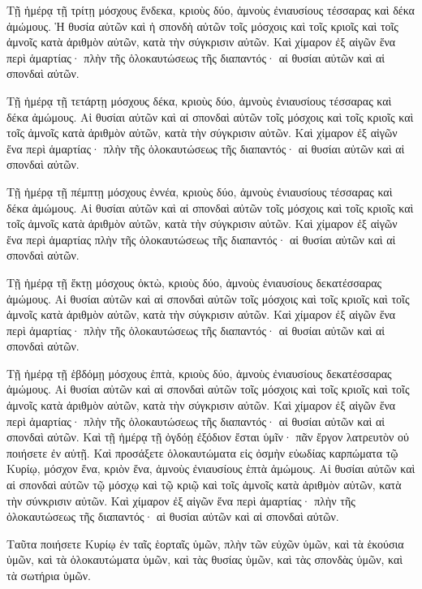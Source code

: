 {\par }{\PP {}Τῇ ἡμέρᾳ τῇ τρίτῃ μόσχους ἕνδεκα, κριοὺς δύο, ἀμνοὺς ἐνιαυσίους τέσσαρας καὶ δέκα ἀμώμους.
Ἡ θυσία αὐτῶν καὶ ἡ σπονδὴ αὐτῶν τοῖς μόσχοις καὶ τοῖς κριοῖς καὶ τοῖς ἀμνοῖς κατὰ ἀριθμὸν αὐτῶν, κατὰ τὴν σύγκρισιν αὐτῶν.
Καὶ χίμαρον ἐξ αἰγῶν ἕνα περὶ ἁμαρτίας· πλὴν τῆς ὁλοκαυτώσεως τῆς διαπαντός· αἱ θυσίαι αὐτῶν καὶ αἱ σπονδαὶ αὐτῶν.
\par }{\PP {}Τῇ ἡμέρᾳ τῇ τετάρτῃ μόσχους δέκα, κριοὺς δύο, ἀμνοὺς ἐνιαυσίους τέσσαρας καὶ δέκα ἀμώμους.
Αἱ θυσίαι αὐτῶν καὶ αἱ σπονδαὶ αὐτῶν τοῖς μόσχοις καὶ τοῖς κριοῖς καὶ τοῖς ἀμνοῖς κατὰ ἀριθμὸν αὐτῶν, κατὰ τὴν σύγκρισιν αὐτῶν.
Καὶ χίμαρον ἐξ αἰγῶν ἕνα περὶ ἁμαρτίας· πλὴν τῆς ὁλοκαυτώσεως τῆς διαπαντός· αἱ θυσίαι αὐτῶν καὶ αἱ σπονδαὶ αὐτῶν.
\par }{\PP {}Τῇ ἡμέρᾳ τῇ πέμπτῃ μόσχους ἐννέα, κριοὺς δύο, ἀμνοὺς ἐνιαυσίους τέσσαρας καὶ δέκα ἀμώμους.
Αἱ θυσίαι αὐτῶν καὶ αἱ σπονδαὶ αὐτῶν τοῖς μόσχοις καὶ τοῖς κριοῖς καὶ τοῖς ἀμνοῖς κατὰ ἀριθμὸν αὐτῶν, κατὰ τὴν σύγκρισιν αὐτῶν.
Καὶ χίμαρον ἐξ αἰγῶν ἕνα περὶ ἁμαρτίας πλὴν τῆς ὁλοκαυτώσεως τῆς διαπαντός· αἱ θυσίαι αὐτῶν καὶ αἱ σπονδαὶ αὐτῶν.
\par }{\PP {}Τῇ ἡμέρᾳ τῇ ἕκτῃ μόσχους ὀκτὼ, κριοὺς δύο, ἀμνοὺς ἐνιαυσίους δεκατέσσαρας ἀμώμους.
Αἱ θυσίαι αὐτῶν καὶ αἱ σπονδαὶ αὐτῶν τοῖς μόσχοις καὶ τοῖς κριοῖς καὶ τοῖς ἀμνοῖς κατὰ ἀριθμὸν αὐτῶν, κατὰ τὴν σύγκρισιν αὐτῶν.
Καὶ χίμαρον ἐξ αἰγῶν ἕνα περὶ ἁμαρτίας· πλὴν τῆς ὁλοκαυτώσεως τῆς διαπαντός· αἱ θυσίαι αὐτῶν καὶ αἱ σπονδαὶ αὐτῶν.
\par }{\PP {}Τῇ ἡμέρᾳ τῇ ἑβδόμῃ μόσχους ἑπτὰ, κριοὺς δύο, ἀμνοὺς ἐνιαυσίους δεκατέσσαρας ἀμώμους.
Αἱ θυσίαι αὐτῶν καὶ αἱ σπονδαὶ αὐτῶν τοῖς μόσχοις καὶ τοῖς κριοῖς καὶ τοῖς ἀμνοῖς κατὰ ἀριθμὸν αὐτῶν, κατὰ τὴν σύγκρισιν αὐτῶν.
Καὶ χίμαρον ἐξ αἰγῶν ἕνα περὶ ἁμαρτίας· πλὴν τῆς ὁλοκαυτώσεως τῆς διαπαντός· αἱ θυσίαι αὐτῶν καὶ αἱ σπονδαὶ αὐτῶν.
Καὶ τῇ ἡμέρᾳ τῇ ὀγδόῃ ἐξόδιον ἔσται ὑμῖν· πᾶν ἔργον λατρευτὸν οὐ ποιήσετε ἐν αὐτῇ.
Καὶ προσάξετε ὁλοκαυτώματα εἰς ὀσμὴν εὐωδίας καρπώματα τῷ Κυρίῳ, μόσχον ἕνα, κριὸν ἕνα, ἀμνοὺς ἐνιαυσίους ἑπτὰ ἀμώμους.
Αἱ θυσίαι αὐτῶν καὶ αἱ σπονδαὶ αὐτῶν τῷ μόσχῳ καὶ τῷ κριῷ καὶ τοῖς ἀμνοῖς κατὰ ἀριθμὸν αὐτῶν, κατὰ τὴν σύνκρισιν αὐτῶν.
Καὶ χίμαρον ἐξ αἰγῶν ἕνα περὶ ἁμαρτίας· πλὴν τῆς ὁλοκαυτώσεως τῆς διαπαντός· αἱ θυσίαι αὐτῶν καὶ αἱ σπονδαὶ αὐτῶν.
\par }{\PP {}Ταῦτα ποιήσετε Κυρίῳ ἐν ταῖς ἑορταῖς ὑμῶν, πλὴν τῶν εὐχῶν ὑμῶν, καὶ τὰ ἑκούσια ὑμῶν, καὶ τὰ ὁλοκαυτώματα ὑμῶν, καὶ τὰς θυσίας ὑμῶν, καὶ τὰς σπονδὰς ὑμῶν, καὶ τὰ σωτήρια ὑμῶν.

}
